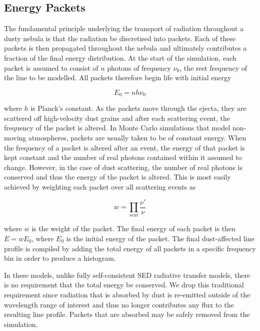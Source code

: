 	\subsection{Energy Packets}
	
	The fundamental principle underlying the transport of radiation throughout a dusty nebula is that the radiation be discretised into packets.  Each of these packets is then propagated throughout the nebula and ultimately contributes a fraction of the final energy distribution.  At the start of the simulation, each packet is assumed to consist of $n$ photons of frequency $\nu_0$, the rest frequency of the line to be modelled.  All packets therefore begin life with initial energy

\begin{equation}
	E_0=nh\nu_0
\end{equation}
	
	
	where $h$ is Planck's constant.  As the packets move through the ejecta, they are scattered off high-velocity dust grains and after each scattering event, the frequency of the packet is altered.  In Monte Carlo simulations that model non-moving atmospheres, packets are usually taken to be of constant energy.  When the frequency of a packet is altered after an event, the energy of that packet is kept constant and the number of real photons contained within it assumed to change.  However, in the case of dust scattering, the number of real photons is conserved and thus the energy of the packet is altered.  This is most easily achieved by weighting each packet over all scattering events as 
	
\begin{equation}
	w=\prod_{scat} \frac{\nu'}{\nu}
\end{equation}

\noindent where $w$ is the weight of the packet.  The final energy of each packet is then $E =w E_0$, where $E_0$ is the initial energy of the packet.  The final dust-affected line profile is compiled by adding the total energy of all packets in a specific frequency bin in order to produce a histogram.
	
	In these models, unlike fully self-consistent SED radiative transfer models, there is no requirement that the total energy be conserved.  We drop this traditional requirement since radiation that is absorbed by dust is re-emitted outside of the wavelength range of interest and thus no longer contributes any flux to the resulting line profile.  Packets that are absorbed may be safely removed from the simulation.
	
